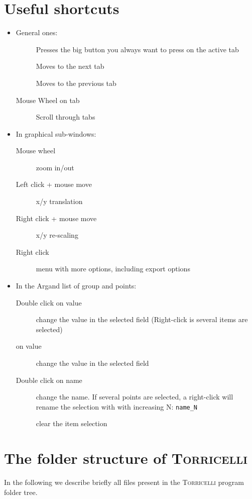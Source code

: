 \documentclass[oldfontcommands,openany,oneside]{memoir}
\begin{document}
\chapter{Useful shortcuts} %
\begin{itemize}
\item General ones:
  \begin{description}
  \item[]	 Presses the big button you always want to press on the active tab
  \item[]	 Moves to the next tab
  \item[]	 Moves to the previous tab
  \item[Mouse Wheel on tab] Scroll through tabs
  \end{description}
\item In graphical sub-windows:
  \begin{description}
  \item[Mouse wheel] zoom in/out
  \item[Left click + mouse move] x/y translation
  \item[Right click + mouse move] x/y re-scaling
  \item[Right click] menu with more options, including export options
  \end{description}
\item In the Argand list of group and points:
  \begin{description}
  \item[Double click on value] change the value in the selected field (Right-click is several items are selected)
  \item[ on value] change the value in the selected field
  \item[Double click on name] change the name. If several points are selected, a right-click will rename the selection with with increasing N: \texttt{name\_N}
  \item[] clear the item selection
  \end{description}
\end{itemize}


\chapter{The folder structure of \textsc{Torricelli}}
In the following we describe briefly all files present in the \textsc{Torricelli} program folder tree.
\end{document}
